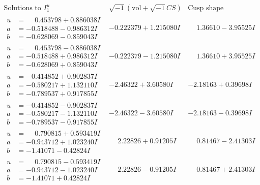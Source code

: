 \documentclass[1p]{elsarticle_modified}
\theoremstyle{definition}
\newcommand{\I}{\sqrt{-1}}
\begin{document}
$$\begin{array}{c|c|c}  
\text{Solutions to }I^u_{1}& \I (\text{vol} + \sqrt{-1}CS) & \text{Cusp shape}\\
 \hline 
\begin{aligned}
u &= \phantom{-}0.453798 + 0.886038 I \\
a &= -0.518488 - 0.986312 I \\
b &= -0.628069 - 0.859043 I\end{aligned}
 & -0.222379 + 1.215080 I & \phantom{-}1.36610 - 3.95525 I \\ \hline\begin{aligned}
u &= \phantom{-}0.453798 - 0.886038 I \\
a &= -0.518488 + 0.986312 I \\
b &= -0.628069 + 0.859043 I\end{aligned}
 & -0.222379 - 1.215080 I & \phantom{-}1.36610 + 3.95525 I \\ \hline\begin{aligned}
u &= -0.414852 + 0.902837 I \\
a &= -0.580217 + 1.132110 I \\
b &= -0.789537 + 0.917855 I\end{aligned}
 & -2.46322 + 3.60580 I & -2.18163 + 0.39698 I \\ \hline\begin{aligned}
u &= -0.414852 - 0.902837 I \\
a &= -0.580217 - 1.132110 I \\
b &= -0.789537 - 0.917855 I\end{aligned}
 & -2.46322 - 3.60580 I & -2.18163 - 0.39698 I \\ \hline\begin{aligned}
u &= \phantom{-}0.790815 + 0.593419 I \\
a &= -0.943712 + 1.023240 I \\
b &= -1.41071 - 0.42824 I\end{aligned}
 & \phantom{-}2.22826 + 0.91205 I & \phantom{-}0.81467 - 2.41303 I \\ \hline\begin{aligned}
u &= \phantom{-}0.790815 - 0.593419 I \\
a &= -0.943712 - 1.023240 I \\
b &= -1.41071 + 0.42824 I\end{aligned}
 & \phantom{-}2.22826 - 0.91205 I & \phantom{-}0.81467 + 2.41303 I \\ \hline\begin{aligned}

\end{aligned}
\end{array}$$
\end{document}
